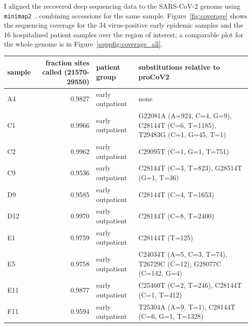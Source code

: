 \documentclass[9pt,twocolumn,twoside]{gsajnl_modified}
\begin{document}
I aligned the recovered deep sequencing data to the SARS-CoV-2 genome using \texttt{minimap2}~\citep{li2018minimap2}, combining accessions for the same sample.
Figure~\ref{fig:coverage} shows the sequencing coverage for the 34 virus-positive early epidemic samples and the 16 hospitalized patient samples over the region of interest; a comparable plot for the whole genome is in Figure~\ref{suppfig:coverage_all}.

\begin{table}[]
{\small
\begin{tabular}{lrll}
\toprule
sample &  fraction sites called (21570-29550) &           patient group &                                        substitutions relative to proCoV2 \\
\midrule
A4 &                               0.9827 &        early outpatient &                                                                          none \\
C1 &                               0.9966 &        early outpatient &  G22081A (A=924, C=4, G=9), C28144T (C=6, T=1185), T29483G (C=1, G=45, T=1) \\
C2 &                               0.9962 &        early outpatient &                                                 C29095T (C=1, G=1, T=751)  \\
C9 &                               0.9536 &        early outpatient &                                  C28144T (C=3, T=823), G28514T (G=1, T=36)  \\
D9 &                               0.9585 &        early outpatient &                                                     C28144T (C=4, T=1653)  \\
D12 &                               0.9970 &        early outpatient &                                                     C28144T (C=8, T=2400)  \\
E1 &                               0.9759 &        early outpatient &                                                           C28144T (T=125)  \\
E5 &                               0.9758 &        early outpatient &              C24034T (A=5, C=3, T=74), T26729C (C=12), G28077C (C=142, G=4)  \\
E11 &                               0.9877 &        early outpatient &                                 C25460T (C=2, T=246), C28144T (C=1, T=412)  \\
F11 &                               0.9594 &        early outpatient &                             T25304A (A=9, T=1), C28144T (C=6, G=1, T=1328)  \\

\end{tabular}}
\end{table}
\end{document}
